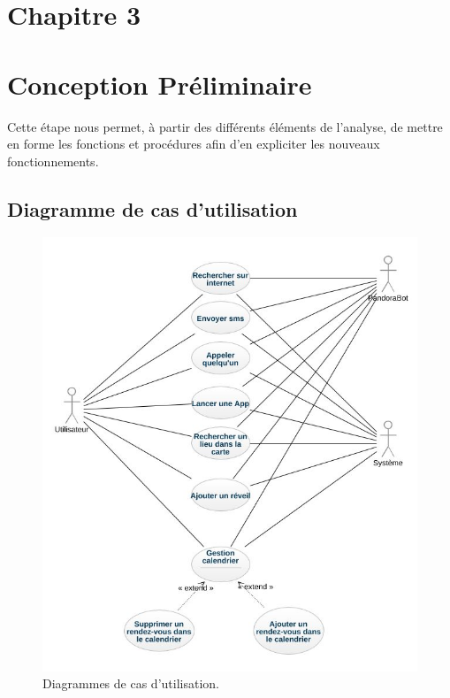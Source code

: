 \section*{Chapitre 3}
\section{Conception Préliminaire}
\indent Cette étape nous permet, à partir des différents éléments de l'analyse, de mettre en forme les fonctions et procédures afin d'en expliciter les nouveaux fonctionnements.

\subsection{Diagramme de cas d'utilisation}
\begin{figure}[ht]
\centering
\includegraphics[scale=0.5]{./diagrammes/UsecaseDiagram.jpeg}
\caption{Diagrammes de cas d'utilisation.\label{fig2}}
\end{figure}

